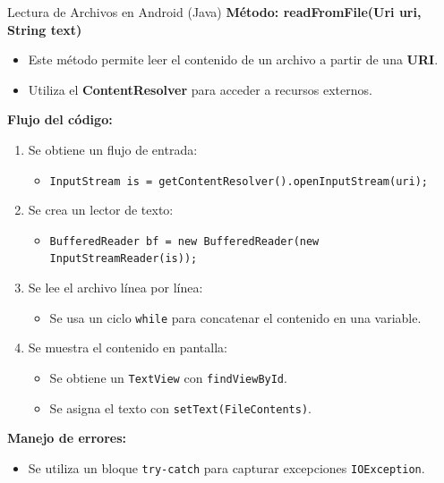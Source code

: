 \begin{frame}{Lectura de Archivos en Android (Java)}
\textbf{Método: readFromFile(Uri uri, String text)}

\begin{itemize}
    \item Este método permite leer el contenido de un archivo a partir de una \textbf{URI}.
    \item Utiliza el \textbf{ContentResolver} para acceder a recursos externos.
\end{itemize}


\textbf{Flujo del código:}
\begin{enumerate}
    \item Se obtiene un flujo de entrada:
    \begin{itemize}
        \item \texttt{InputStream is = getContentResolver().openInputStream(uri);}
    \end{itemize}
    
    \item Se crea un lector de texto:
    \begin{itemize}
        \item \texttt{BufferedReader bf = new BufferedReader(new InputStreamReader(is));}
    \end{itemize}
    
    \item Se lee el archivo línea por línea:
    \begin{itemize}
        \item Se usa un ciclo \texttt{while} para concatenar el contenido en una variable.
    \end{itemize}
    
    \item Se muestra el contenido en pantalla:
    \begin{itemize}
        \item Se obtiene un \texttt{TextView} con \texttt{findViewById}.
        \item Se asigna el texto con \texttt{setText(FileContents)}.
    \end{itemize}
\end{enumerate}


\textbf{Manejo de errores:}
\begin{itemize}
    \item Se utiliza un bloque \texttt{try-catch} para capturar excepciones \texttt{IOException}.
\end{itemize}

\end{frame}



